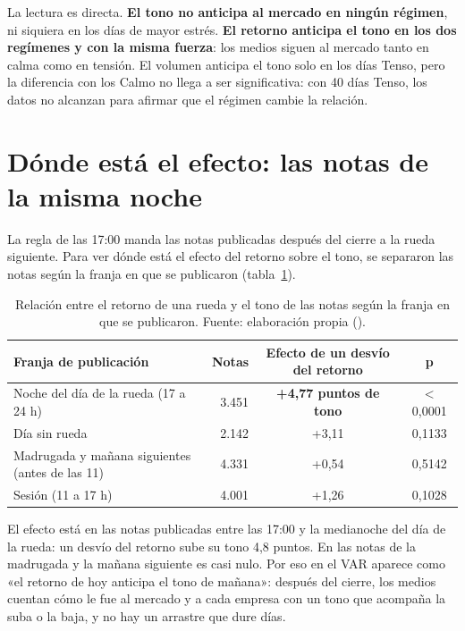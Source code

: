 La lectura es directa. \textbf{El tono no anticipa al mercado en ningún régimen}, ni siquiera en
los días de mayor estrés. \textbf{El retorno anticipa el tono en los dos regímenes y con la misma
fuerza}: los medios siguen al mercado tanto en calma como en tensión. El volumen anticipa el tono
solo en los días Tenso, pero la diferencia con los Calmo no llega a ser significativa: con 40 días
Tenso, los datos no alcanzan para afirmar que el régimen cambie la relación.

\section{Dónde está el efecto: las notas de la misma noche}

La regla de las 17:00 manda las notas publicadas después del cierre a la rueda siguiente. Para
ver dónde está el efecto del retorno sobre el tono, se separaron las notas según la franja en que
se publicaron (tabla~\ref{tab:franjas}).

\begin{table}[H]
\centering\footnotesize
\begin{tabular}{@{}lrcc@{}}
\toprule
\textbf{Franja de publicación} & \textbf{Notas} & \textbf{Efecto de un desvío del retorno} & \textbf{p} \\
\midrule
Noche del día de la rueda (17 a 24 h) & 3.451 & \textbf{+4,77 puntos de tono} & $<$0,0001 \\
Día sin rueda & 2.142 & +3,11 & 0,1133 \\
Madrugada y mañana siguientes (antes de las 11) & 4.331 & +0,54 & 0,5142 \\
Sesión (11 a 17 h) & 4.001 & +1,26 & 0,1028 \\
\bottomrule
\end{tabular}
\caption{Relación entre el retorno de una rueda y el tono de las notas según la franja en que
se publicaron. Fuente: elaboración propia ().}
\label{tab:franjas}
\end{table}

El efecto está en las notas publicadas entre las 17:00 y la medianoche del día de la rueda: un
desvío del retorno sube su tono 4,8 puntos. En las notas de la madrugada y la mañana siguiente es
casi nulo. Por eso en el VAR aparece como «el retorno de hoy anticipa el tono de mañana»: después
del cierre, los medios cuentan cómo le fue al mercado y a cada empresa con un tono que acompaña la
suba o la baja, y no hay un arrastre que dure días.

